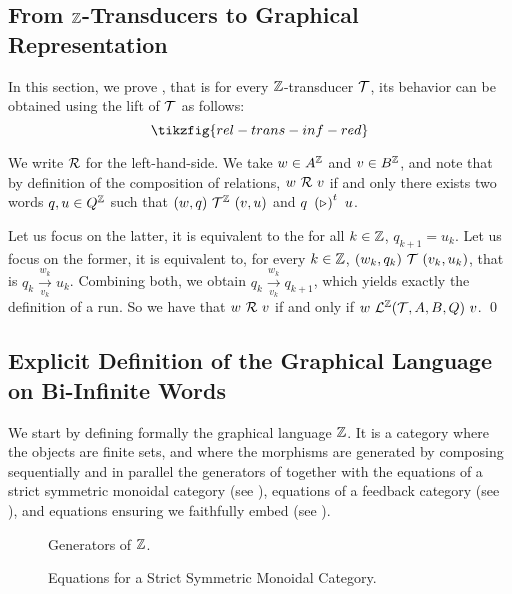 
\subsection{From ${\mathbb{Z}}$-Transducers to Graphical Representation}\label{app:inf-zeta-transducer-red}

In this section, we prove , that is for every ${\mathbb{Z}}$-transducer ${\mathcal{T}}$, its behavior can be obtained using the lift of ${\mathcal{T}}$ as follows:
\[ \tikzfig{rel-trans-inf-red} \]

We write ${\mathcal{R}}$ for the left-hand-side. We take $w \in A^{\mathbb{Z}}$ and $v \in B^{\mathbb{Z}}$, and note that by definition of the composition of relations, $w~{\mathcal{R}}~v$ if and only there exists two words $q,u \in Q^{\mathbb{Z}}$ such that $(w,q)~{\mathcal{T}}^{\mathbb{Z}}~(v,u)$ and $q~\transpose{\left(\shift{}{}\right)}~u$. 

Let us focus on the latter, it is equivalent to the for all $k \in {\mathbb{Z}}$, $q_{k+1} = u_k$.
Let us focus on the former, it is equivalent to, for every $k \in {\mathbb{Z}}$, $(w_k,q_k)~{\mathcal{T}}~(v_k,u_k)$, that is $q_k \xrightarrow[v_k]{w_k} u_k$. Combining both, we obtain $q_k \xrightarrow[v_k]{w_k} q_{k+1}$, which yields exactly the definition of a run. So we have that $w~{\mathcal{R}}~v$ if and only if $w~{\mathcal{L}}^{\mathbb{Z}}({\mathcal{T}},A,B,Q)~v$. \qed


\subsection{Explicit Definition of the Graphical Language on Bi-Infinite Words}\label{app:infinite-language}

We start by defining formally the graphical language ${\mathbb{Z}}$. It is a category where the objects are finite sets, and where the morphisms are generated by composing sequentially and in parallel the generators of  together with the equations of a strict symmetric monoidal category (see ), equations of a feedback  category (see ), and equations ensuring we faithfully embed  (see ).

\begin{figure*}[h]
	\caption{Generators of  ${\mathbb{Z}}$.}
	\label{appfig:graph-generators-inf}
\end{figure*}

\begin{figure*}[h]
	\caption{Equations for a Strict Symmetric Monoidal Category.}
	\label{appfig:rel-equations-inf}
\end{figure*}

